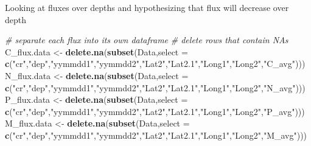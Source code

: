 \documentclass[]{article}
\newenvironment{Shaded}{\begin{snugshade}}{\end{snugshade}}
\newcommand{\CommentTok}[1]{\textcolor[rgb]{0.56,0.35,0.01}{\textit{#1}}}
\newcommand{\DataTypeTok}[1]{\textcolor[rgb]{0.13,0.29,0.53}{#1}}
\newcommand{\KeywordTok}[1]{\textcolor[rgb]{0.13,0.29,0.53}{\textbf{#1}}}
\newcommand{\NormalTok}[1]{#1}
\newcommand{\StringTok}[1]{\textcolor[rgb]{0.31,0.60,0.02}{#1}}
\begin{document}
Looking at fluxes over depths and hypothesizing that flux will decrease
over depth

\begin{Shaded}
\begin{Highlighting}[]
\CommentTok{# separate each flux into its own dataframe }
\CommentTok{# delete rows that contain NAs }
\NormalTok{C_flux.data <-}\StringTok{ }\KeywordTok{delete.na}\NormalTok{(}\KeywordTok{subset}\NormalTok{(Data,}\DataTypeTok{select =} \KeywordTok{c}\NormalTok{(}\StringTok{"cr"}\NormalTok{,}\StringTok{"dep"}\NormalTok{,}\StringTok{"yymmdd1"}\NormalTok{,}\StringTok{"yymmdd2"}\NormalTok{,}\StringTok{"Lat2"}\NormalTok{,}\StringTok{"Lat2.1"}\NormalTok{,}\StringTok{"Long1"}\NormalTok{,}\StringTok{"Long2"}\NormalTok{,}\StringTok{"C_avg"}\NormalTok{)))}
\NormalTok{N_flux.data <-}\StringTok{ }\KeywordTok{delete.na}\NormalTok{(}\KeywordTok{subset}\NormalTok{(Data,}\DataTypeTok{select =} \KeywordTok{c}\NormalTok{(}\StringTok{"cr"}\NormalTok{,}\StringTok{"dep"}\NormalTok{,}\StringTok{"yymmdd1"}\NormalTok{,}\StringTok{"yymmdd2"}\NormalTok{,}\StringTok{"Lat2"}\NormalTok{,}\StringTok{"Lat2.1"}\NormalTok{,}\StringTok{"Long1"}\NormalTok{,}\StringTok{"Long2"}\NormalTok{,}\StringTok{"N_avg"}\NormalTok{)))}
\NormalTok{P_flux.data <-}\StringTok{ }\KeywordTok{delete.na}\NormalTok{(}\KeywordTok{subset}\NormalTok{(Data,}\DataTypeTok{select =} \KeywordTok{c}\NormalTok{(}\StringTok{"cr"}\NormalTok{,}\StringTok{"dep"}\NormalTok{,}\StringTok{"yymmdd1"}\NormalTok{,}\StringTok{"yymmdd2"}\NormalTok{,}\StringTok{"Lat2"}\NormalTok{,}\StringTok{"Lat2.1"}\NormalTok{,}\StringTok{"Long1"}\NormalTok{,}\StringTok{"Long2"}\NormalTok{,}\StringTok{"P_avg"}\NormalTok{)))}
\NormalTok{M_flux.data <-}\StringTok{ }\KeywordTok{delete.na}\NormalTok{(}\KeywordTok{subset}\NormalTok{(Data,}\DataTypeTok{select =} \KeywordTok{c}\NormalTok{(}\StringTok{"cr"}\NormalTok{,}\StringTok{"dep"}\NormalTok{,}\StringTok{"yymmdd1"}\NormalTok{,}\StringTok{"yymmdd2"}\NormalTok{,}\StringTok{"Lat2"}\NormalTok{,}\StringTok{"Lat2.1"}\NormalTok{,}\StringTok{"Long1"}\NormalTok{,}\StringTok{"Long2"}\NormalTok{,}\StringTok{"M_avg"}\NormalTok{)))}
\end{Highlighting}
\end{Shaded}
\end{document}
